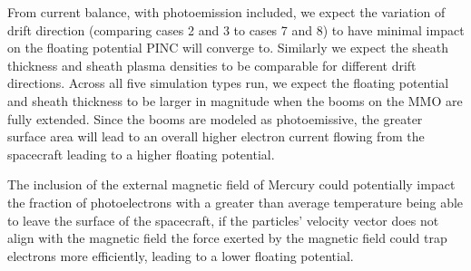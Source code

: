 From current balance, with photoemission included, we expect the variation of drift direction (comparing cases 2 and 3 to cases 7 and 8) to have minimal impact on the floating potential PINC will converge to. Similarly we expect the sheath thickness and sheath plasma densities to be comparable for different drift directions. Across all five simulation types run, we expect the floating potential and sheath thickness to be larger in magnitude when the booms on the MMO are fully extended. Since the booms are modeled as photoemissive, the greater surface area will lead to an overall higher electron current flowing from the spacecraft leading to a higher floating potential.

The inclusion of the external magnetic field of Mercury could potentially impact the fraction of photoelectrons with a greater than average temperature being able to leave the surface of the spacecraft, if the particles' velocity vector does not align with the magnetic field the force exerted by the magnetic field could trap electrons more efficiently, leading to a lower floating potential.        

